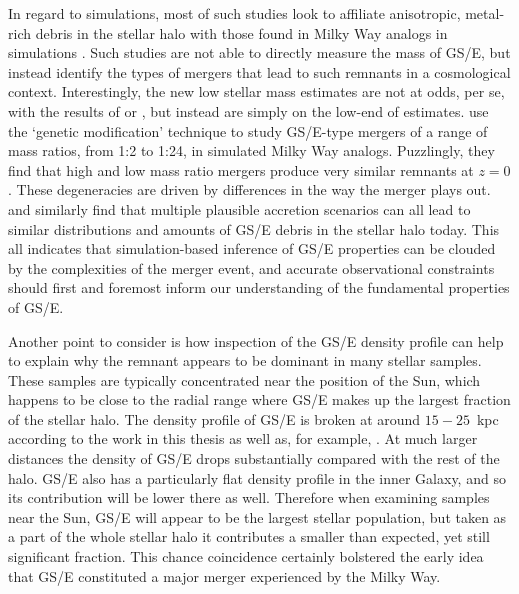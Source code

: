 In regard to simulations, most of such studies look to affiliate anisotropic, metal-rich debris in the stellar halo with those found in Milky Way analogs in simulations \parencite[e.g.][]{fattahi19,mackereth19a}. Such studies are not able to directly measure the mass of GS/E, but instead identify the types of mergers that lead to such remnants in a cosmological context. Interestingly, the new low stellar mass estimates are not at odds, per se, with the results of \textcite{fattahi19} or \textcite{mackereth19a}, but instead are simply on the low-end of estimates. \textcite{rey23} use the `genetic modification' technique \parencite{stopyra21,rey22} to study GS/E-type mergers of a range of mass ratios, from 1:2 to 1:24, in simulated Milky Way analogs. Puzzlingly, they find that high and low mass ratio mergers produce very similar remnants at $z=0$. These degeneracies are driven by differences in the way the merger plays out. \textcite{grand20} and \textcite{orkney22} similarly find that multiple plausible accretion scenarios can all lead to similar distributions and amounts of GS/E debris in the stellar halo today. This all indicates that simulation-based inference of GS/E properties can be clouded by the complexities of the merger event, and accurate observational constraints should first and foremost inform our understanding of the fundamental properties of GS/E.

Another point to consider is how inspection of the GS/E density profile can help to explain why the remnant appears to be dominant in many stellar samples. These samples are typically concentrated near the position of the Sun, which happens to be close to the radial range where GS/E makes up the largest fraction of the stellar halo. The density profile of GS/E is broken at around $15-25$~kpc according to the work in this thesis as well as, for example, \textcite{han22}. At much larger distances the density of GS/E drops substantially compared with the rest of the halo. GS/E also has a particularly flat density profile in the inner Galaxy, and so its contribution will be lower there as well. Therefore when examining samples near the Sun, GS/E will appear to be the largest stellar population, but taken as a part of the whole stellar halo it contributes a smaller than expected, yet still significant fraction. This chance coincidence certainly bolstered the early idea that GS/E constituted a major merger experienced by the Milky Way.


